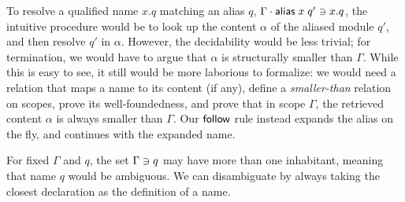 \documentclass{article}
\theoremstyle{definition}
\theoremstyle{plain}
\theoremstyle{remark}
\begin{document}
To resolve a qualified name $x.q$ matching an alias $q$,
$\Gamma \cdot \mathsf{alias}\;x\;q'\ni x.q$,
the intuitive procedure would be to look up the content $\alpha$
of the aliased module $q'$, and then resolve $q'$ in $\alpha$.
However, the decidability would be less trivial; for termination,
we would have to argue that $\alpha$ is structurally smaller
than $\Gamma$.  While this is easy to see, it still would be more
laborious to formalize: we would need a relation that maps a name to
its content (if any), define a \emph{smaller-than} relation on scopes,
prove its well-foundedness, and prove that in scope $\Gamma$,
the retrieved content $\alpha$ is always smaller than $\Gamma$.
Our $\mathsf{follow}$ rule instead expands the alias on the fly, and
continues with the expanded name.


For fixed $\Gamma$ and $q$, the set $\Gamma\ni q$
may have more than one inhabitant, meaning that
name $q$ would be ambiguous.
We can disambiguate by always taking the closest declaration as the
definition of a name.
\end{document}

